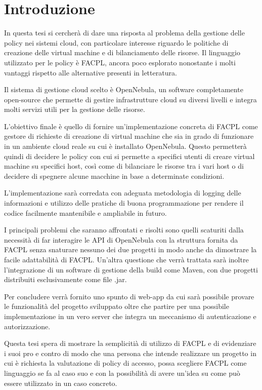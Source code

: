 
\chapter{Introduzione}
In questa tesi si cercherà di dare una risposta al problema della gestione delle policy nei sistemi cloud, con particolare interesse riguardo le politiche di creazione delle virtual machine e di bilanciamento delle risorse. Il linguaggio utilizzato per le policy è FACPL, ancora poco esplorato nonostante i molti vantaggi rispetto alle alternative presenti in letteratura.\par
Il sistema di gestione cloud scelto è OpenNebula, un software completamente open-source che permette di gestire infrastrutture cloud su diversi livelli e integra molti servizi utili per la gestione delle risorse.\par
L'obiettivo finale è quello di fornire un'implementazione concreta di FACPL come gestore di richieste di creazione di virtual machine che sia in grado di funzionare in un ambiente cloud reale su cui è installato OpenNebula. Questo permetterà quindi di decidere le policy con cui si permette a specifici utenti di creare virtual machine su specifici host, così come di bilanciare le risorse tra i vari host o di decidere di spegnere alcune macchine in base a determinate condizioni.\par
L'implementazione sarà corredata con adeguata metodologia di logging delle informazioni e utilizzo delle pratiche di buona programmazione per rendere il codice facilmente mantenibile e ampliabile in futuro.\par
I principali problemi che saranno affrontati e risolti sono quelli scaturiti dalla necessità di far interagire le API di OpenNebula con la struttura fornita da FACPL senza snaturare nessuno dei due progetti in modo anche da dimostrare la facile adattabilità di FACPL. Un'altra questione che verrà trattata sarà inoltre l'integrazione di un software di gestione della build come Maven, con due progetti distribuiti esclusivamente come file .jar.\par
Per concludere verrà fornito uno spunto di web-app da cui sarà possibile provare le funzionalità del progetto sviluppato oltre che partire per una possibile implementazione in un vero server che integra un meccanismo di autenticazione e autorizzazione.\par
Questa tesi spera di mostrare la semplicitià di utilizzo di FACPL e di evidenziare i suoi pro e contro di modo che una persona che intende realizzare un progetto in cui è richiesta la valutazione di policy di accesso, possa scegliere FACPL come linguaggio se fa al caso suo e con la possibilità di avere un'idea su come può essere utilizzato in un caso concreto.

